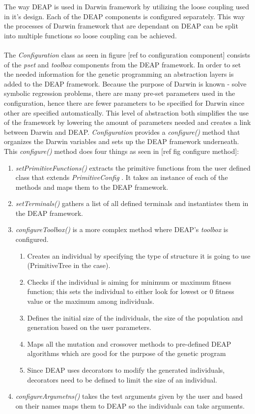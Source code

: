 The way DEAP is used in Darwin framework by utilizing the loose coupling used in it's design. Each of the DEAP components is configured
separately. This way the processes of Darwin framework that are dependant on DEAP can be split into multiple functions so loose coupling can
be achieved.
\paragraph{}
The \textit{Configuration} class as seen in figure [ref to configuration component] consists of the \textit{pset} and \textit{toolbox} components
from the DEAP framework. In order to set the needed information for the genetic programming an abstraction layers is added to the DEAP framework.
Because the purpose of Darwin is known - solve symbolic regression problems, there are many pre-set parameters used in the configuration, hence there are 
fewer parameters to be specified for Darwin since other are specified automatically. This level of abstraction both simplifies the use of the
framework by lowering the amount of parameters needed and creates a link between Darwin and DEAP. \textit{Configuration} provides a \textit{configure()} method
that organizes the Darwin variables and sets up the DEAP framework underneath. This \textit{configure()} method does four things as seen in [ref fig configure method]:

\begin{enumerate}
  \item \textit{setPrimitiveFunctions()} extracts the primitive functions from the user defined class that extends \textit{PrimitiveConfig} . It takes an instance
of each of the methods and maps them to the DEAP framework.
  \item \textit{setTerminals()} gathers a list of all defined terminals and instantiates them in the DEAP framework.
  \item \textit{configureToolbox()} is a more complex method where DEAP's \textit{toolbox} is configured.
  \begin{enumerate}
	\item Creates an individual by specifying the type of structure it is going to use (PrimitiveTree in the case). 
	\item Checks if the individual is aiming for minimum or maximum fitness function; this sets the individual to either look for lowest or 0 fitness value or the maximum among individuals.
	\item Defines the initial size of the individuals, the size of the population and generation based on the user parameters.
	\item Maps all the mutation and crossover methods to pre-defined DEAP algorithms which are good for the purpose of the genetic program
	\item Since DEAP uses decorators to modify the generated individuals, decorators need to be defined to limit the size of an individual.
  \end{enumerate}
  \item \textit{configureArgumetns()} takes the test arguments given by the user and based on their names maps them to DEAP so the individuals can take arguments.
\end{enumerate}